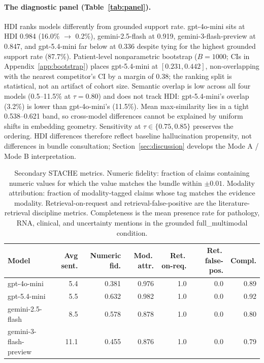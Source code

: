 \documentclass[11pt]{article}
\begin{document}
\paragraph{The diagnostic panel (Table~\ref{tab:panel}).}
HDI ranks models differently from grounded support rate. gpt-4o-mini sits at HDI 0.984 (16.0\% $\to$ 0.2\%), gemini-2.5-flash at 0.919, gemini-3-flash-preview at 0.847, and gpt-5.4-mini far below at 0.336 despite tying for the highest grounded support rate (87.7\%). Patient-level nonparametric bootstrap ($B{=}1000$; CIs in Appendix~\ref{app:bootstrap}) places gpt-5.4-mini at $[0.231, 0.442]$, non-overlapping with the nearest competitor's CI by a margin of 0.38; the ranking split is statistical, not an artifact of cohort size. Semantic overlap is low across all four models (0.5--11.5\% at $\tau{=}0.80$) and does not track HDI: gpt-5.4-mini's overlap (3.2\%) is lower than gpt-4o-mini's (11.5\%). Mean max-similarity lies in a tight 0.538--0.621 band, so cross-model differences cannot be explained by uniform shifts in embedding geometry. Sensitivity at $\tau\in\{0.75, 0.85\}$ preserves the ordering. HDI differences therefore reflect baseline hallucination propensity, not differences in bundle consultation; Section~\ref{sec:discussion} develops the Mode A / Mode B interpretation.

\begin{table}[!t]
\centering
\small
\begin{tabular}{lrrrrrr}
\toprule
\textbf{Model} & \textbf{Avg sent.} & \textbf{Numeric fid.} & \textbf{Mod.\,attr.} & \textbf{Ret.\,on-req.} & \textbf{Ret.\,false-pos.} & \textbf{Compl.} \\
\midrule
gpt-4o-mini             & 5.4  & 0.381 & 0.976 & 1.0 & 0.0 & 0.89 \\
gpt-5.4-mini            & 5.5  & 0.632 & 0.982 & 1.0 & 0.0 & 0.92 \\
gemini-2.5-flash        & 8.5  & 0.578 & 0.878 & 1.0 & 0.0 & 0.80 \\
gemini-3-flash-preview  & 11.1 & 0.455 & 0.876 & 1.0 & 0.0 & 0.79 \\
\bottomrule
\end{tabular}
\caption{Secondary STACHE metrics. Numeric fidelity: fraction of claims containing numeric values for which the value matches the bundle within $\pm 0.01$. Modality attribution: fraction of modality-tagged claims whose tag matches the evidence modality. Retrieval-on-request and retrieval-false-positive are the literature-retrieval discipline metrics. Completeness is the mean presence rate for pathology, RNA, clinical, and uncertainty mentions in the grounded full\_multimodal condition.}
\label{tab:secondary}
\end{table}
\end{document}
